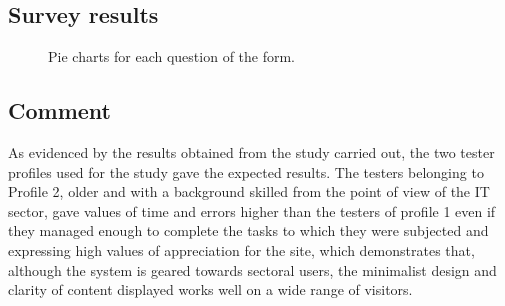 \subsection{Survey results}
\bigskip
\begin{figure}[H]
  \centering
    \caption{Pie charts for each question of the form.}

\end{figure}


\subsection{Comment}
As evidenced by the results obtained from the study carried out, the two tester profiles used for the study gave the expected results. The testers belonging to Profile 2, older and with a background skilled from the point of view of the IT sector, gave values of time and errors higher than the testers of profile 1 even if they managed enough to complete the tasks to which they were subjected and expressing high values of appreciation for the site, which demonstrates that, although the system is geared towards sectoral users, the minimalist design and clarity of content displayed works well on a wide range of visitors.



